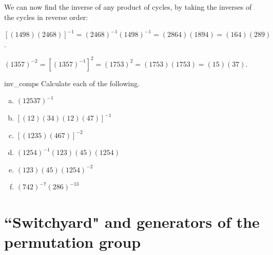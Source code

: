 We can now find the inverse of any product of cycles, by taking the inverses of the cycles in reverse order:

\begin{example}{}
$\left[ ( 1 4 9 8 )( 2 4 6 8 ) \right] ^{-1} = ( 2 4 6 8 )^{-1}( 1 4 9 8 )^{-1} = ( 2 8 6 4 )(1 8 9 4) = ( 1 6 4)( 2 8 9)$. 
\end{example}

\begin{example}{}
$( 1 3 5 7) ^{-2} = \left[ ( 1 3 5 7 )^{-1} \right]^2 = ( 1 7  5 3 )^2 = ( 1 7 5 3 )(1 7 5 3) = ( 1 5 )(3 7)$. 
\end{example}


\begin{exercise}{inv_comps}
Calculate each of the following.
\begin{multicols}{2}
\begin{enumerate}[(a)]    
\item
$(1 2 5 3 7)^{-1}$
 \item
$[(1 2)(3 4)(1 2)(4 7)]^{-1}$
\item
$[( 1 2 3 5 )( 4 6 7 )]^{-2}$
\item
$( 1 2 5 4 )^{-1} ( 1 2 3 )( 4 5 ) ( 1 2 5 4 )$
\item
$( 1 2 3 )( 4 5 ) ( 1 2 5 4 )^{-2}$
\item
$( 7 4 2 )^{-7} ( 2 8 6)^{-13}$

 \end{enumerate}
\end{multicols}
\end{exercise}


\section{``Switchyard" and generators of the permutation group\quad
{}}

